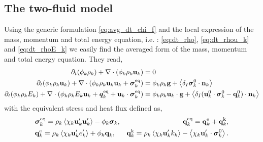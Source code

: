 \subsection{The two-fluid model}
\label{ap:two-fluid_model}

Using the generic formulation \ref{eq:avg_dt_chi_f} and the local expression of the mass, momentum and total energy equation, i.e. : \ref{eq:dt_rho}, \ref{eq:dt_rhou_k} and \ref{eq:dt_rhoE_k} we easily find the averaged form of the mass, momentum and total energy equation.
They read, 
\begin{align}
    \label{eq:dt_avg_rho}
    \partial_t (\phi_k \rho_k)  
    + \mathbf{\nabla}\cdot (
        \phi_k \rho_k\textbf{u}_k
    )
    &= 
    0\\
    \label{eq:dt_avg_rhou_k}
    \partial_t (\phi_k \rho_k\textbf{u}_k)  
    + \mathbf{\nabla}\cdot (
        \phi_k \rho_k\textbf{u}_k\textbf{u}_k
        + \bm{\sigma}_k^\text{eq}
    )
    &= 
    \phi_k \rho_k \textbf{g} 
    +  \left<\delta_I \bm{\sigma}_k^0 \cdot \textbf{n}_k\right>\\
    \label{eq:dt_avg_rhoE_k}
    \partial_t (\phi_k\rho_kE_k)  
    + \mathbf{\nabla}\cdot (
        \phi_k\rho_kE_k\textbf{u}_k
        + \bm{q}_k^\text{eq}
        + \textbf{u}_k \cdot \bm{\sigma}_k^\text{eq}
        )
    &= 
    \phi_k \rho_k\textbf{u}_k \cdot \textbf{g} 
    + \left<\delta_I (\textbf{u}_k^0 \cdot \bm{\sigma}_k^0 - \textbf{q}_k^0)\cdot \textbf{n}_k\right>
\end{align} 
with the equivalent stress and heat flux defined as, 
\begin{align*}
    &\bm{\sigma}_k^\text{eq}
    = 
     \rho_k\avg{\chi_k \textbf{u}_k'\textbf{u}_k'}
      - \phi_k \bm{\sigma}_k,%
    &\textbf{q}_k^\text{eq}
    =\textbf{q}_k^\text{e} +\textbf{q}_k^\text{k},  \\
    &\textbf{q}_k^\text{e}
    = \rho_k \avg{\chi_k\textbf{u}_k' e_k'} 
    + \phi_k\textbf{q}_k,
    &\textbf{q}_k^\text{k}
    = \rho_k \avg{\chi_k \textbf{u}_k' k_k} 
    - \avg{\chi_k \textbf{u}_k' \cdot \bm{\sigma}_k^0}.
\end{align*}


